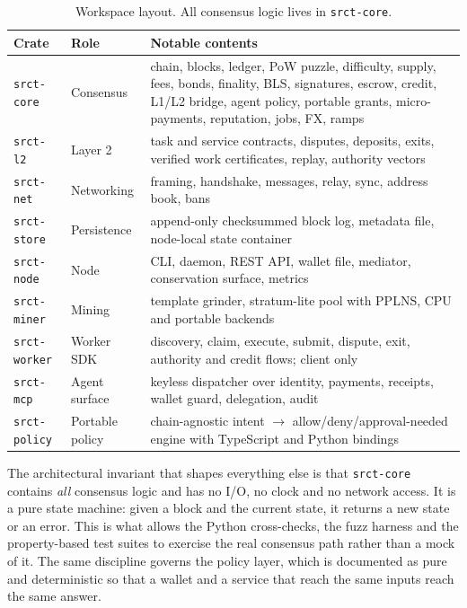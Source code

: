 \documentclass{article}
\begin{document}
\begin{table}[htbp]
\centering
\begin{tabular}{p{}p{}p{}}
\toprule
\textbf{Crate} & \textbf{Role} & \textbf{Notable contents} \\
\midrule
\texttt{srct-core} & Consensus & chain, blocks, ledger, PoW puzzle, difficulty,
  supply, fees, bonds, finality, BLS, signatures, escrow, credit, L1/L2 bridge,
  agent policy, portable grants, micro-payments, reputation, jobs, FX, ramps \\
\texttt{srct-l2} & Layer 2 & task and service contracts, disputes, deposits,
  exits, verified work certificates, replay, authority vectors \\
\texttt{srct-net} & Networking & framing, handshake, messages, relay, sync,
  address book, bans \\
\texttt{srct-store} & Persistence & append-only checksummed block log, metadata
  file, node-local state container \\
\texttt{srct-node} & Node & CLI, daemon, REST API, wallet file, mediator,
  conservation surface, metrics \\
\texttt{srct-miner} & Mining & template grinder, stratum-lite pool with PPLNS,
  CPU and portable backends \\
\texttt{srct-worker} & Worker SDK & discovery, claim, execute, submit, dispute,
  exit, authority and credit flows; client only \\
\texttt{srct-mcp} & Agent surface & keyless dispatcher over identity, payments,
  receipts, wallet guard, delegation, audit \\
\texttt{srct-policy} & Portable policy & chain-agnostic intent $\rightarrow$
  allow/deny/approval-needed engine with TypeScript and Python bindings \\
\bottomrule
\end{tabular}
\caption{Workspace layout. All consensus logic lives in \texttt{srct-core}.}
\label{tab:crates}
\end{table}

The architectural invariant that shapes everything else is that
\texttt{srct-core} contains \emph{all} consensus logic and has no I/O, no clock
and no network access. It is a pure state machine: given a block and the
current state, it returns a new state or an error. This is what allows the
Python cross-checks, the fuzz harness and the property-based test suites to
exercise the real consensus path rather than a mock of it. The same discipline
governs the policy layer, which is documented as pure and deterministic so that
a wallet and a service that reach the same inputs reach the same answer.
\end{document}
